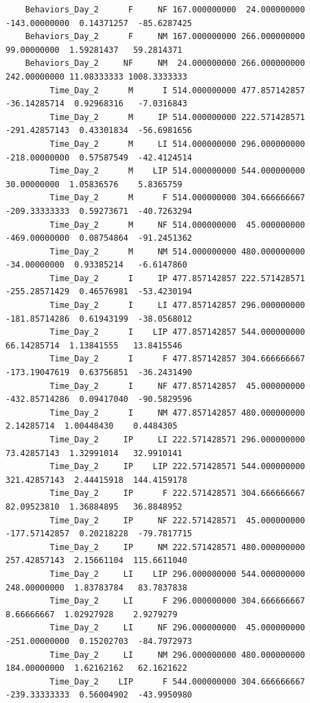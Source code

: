 \documentclass[
  landscape]{article}
\begin{document}
\begin{verbatim}
    Behaviors_Day_2      F     NF 167.000000000  24.000000000 -143.00000000  0.14371257  -85.6287425
    Behaviors_Day_2      F     NM 167.000000000 266.000000000   99.00000000  1.59281437   59.2814371
    Behaviors_Day_2     NF     NM  24.000000000 266.000000000  242.00000000 11.08333333 1008.3333333
         Time_Day_2      M      I 514.000000000 477.857142857  -36.14285714  0.92968316   -7.0316843
         Time_Day_2      M     IP 514.000000000 222.571428571 -291.42857143  0.43301834  -56.6981656
         Time_Day_2      M     LI 514.000000000 296.000000000 -218.00000000  0.57587549  -42.4124514
         Time_Day_2      M    LIP 514.000000000 544.000000000   30.00000000  1.05836576    5.8365759
         Time_Day_2      M      F 514.000000000 304.666666667 -209.33333333  0.59273671  -40.7263294
         Time_Day_2      M     NF 514.000000000  45.000000000 -469.00000000  0.08754864  -91.2451362
         Time_Day_2      M     NM 514.000000000 480.000000000  -34.00000000  0.93385214   -6.6147860
         Time_Day_2      I     IP 477.857142857 222.571428571 -255.28571429  0.46576981  -53.4230194
         Time_Day_2      I     LI 477.857142857 296.000000000 -181.85714286  0.61943199  -38.0568012
         Time_Day_2      I    LIP 477.857142857 544.000000000   66.14285714  1.13841555   13.8415546
         Time_Day_2      I      F 477.857142857 304.666666667 -173.19047619  0.63756851  -36.2431490
         Time_Day_2      I     NF 477.857142857  45.000000000 -432.85714286  0.09417040  -90.5829596
         Time_Day_2      I     NM 477.857142857 480.000000000    2.14285714  1.00448430    0.4484305
         Time_Day_2     IP     LI 222.571428571 296.000000000   73.42857143  1.32991014   32.9910141
         Time_Day_2     IP    LIP 222.571428571 544.000000000  321.42857143  2.44415918  144.4159178
         Time_Day_2     IP      F 222.571428571 304.666666667   82.09523810  1.36884895   36.8848952
         Time_Day_2     IP     NF 222.571428571  45.000000000 -177.57142857  0.20218228  -79.7817715
         Time_Day_2     IP     NM 222.571428571 480.000000000  257.42857143  2.15661104  115.6611040
         Time_Day_2     LI    LIP 296.000000000 544.000000000  248.00000000  1.83783784   83.7837838
         Time_Day_2     LI      F 296.000000000 304.666666667    8.66666667  1.02927928    2.9279279
         Time_Day_2     LI     NF 296.000000000  45.000000000 -251.00000000  0.15202703  -84.7972973
         Time_Day_2     LI     NM 296.000000000 480.000000000  184.00000000  1.62162162   62.1621622
         Time_Day_2    LIP      F 544.000000000 304.666666667 -239.33333333  0.56004902  -43.9950980

\end{verbatim}
\end{document}
